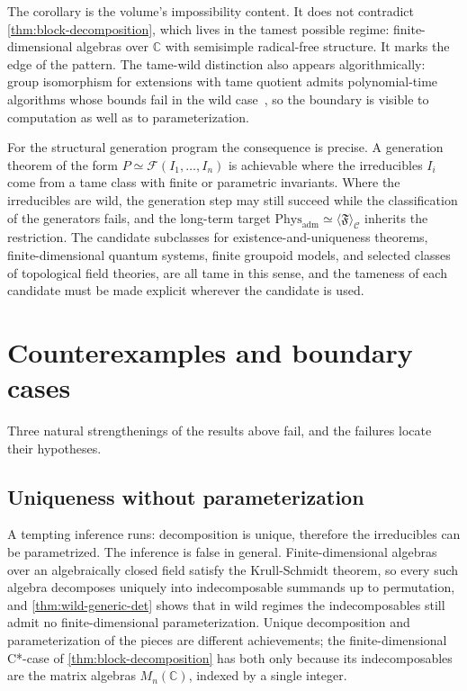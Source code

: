 \documentclass[11pt,letterpaper]{article}
\theoremstyle{definition}
\theoremstyle{remark}
\begin{document}
The corollary is the volume's impossibility content. It does not contradict \cref{thm:block-decomposition}, which lives in the tamest possible regime: finite-dimensional algebras over $\mathbb{C}$ with semisimple radical-free structure. It marks the edge of the pattern. The tame-wild distinction also appears algorithmically: group isomorphism for extensions with tame quotient admits polynomial-time algorithms whose bounds fail in the wild case~\cite{grochow-qiao}, so the boundary is visible to computation as well as to parameterization.

For the structural generation program the consequence is precise. A generation theorem of the form $P \simeq \mathcal{F}(I_1, \dots, I_n)$ is achievable where the irreducibles $I_i$ come from a tame class with finite or parametric invariants. Where the irreducibles are wild, the generation step may still succeed while the classification of the generators fails, and the long-term target $\mathrm{Phys}_{\mathrm{adm}} \simeq \langle \mathfrak{F} \rangle_{\mathcal{C}}$ inherits the restriction. The candidate subclasses for existence-and-uniqueness theorems, finite-dimensional quantum systems, finite groupoid models, and selected classes of topological field theories, are all tame in this sense, and the tameness of each candidate must be made explicit wherever the candidate is used.

\section{Counterexamples and boundary cases}

Three natural strengthenings of the results above fail, and the failures locate their hypotheses.

\subsection{Uniqueness without parameterization}

A tempting inference runs: decomposition is unique, therefore the irreducibles can be parametrized. The inference is false in general. Finite-dimensional algebras over an algebraically closed field satisfy the Krull-Schmidt theorem, so every such algebra decomposes uniquely into indecomposable summands up to permutation, and \cref{thm:wild-generic-det} shows that in wild regimes the indecomposables still admit no finite-dimensional parameterization. Unique decomposition and parameterization of the pieces are different achievements; the finite-dimensional C*-case of \cref{thm:block-decomposition} has both only because its indecomposables are the matrix algebras $M_n(\mathbb{C})$, indexed by a single integer.
\end{document}
